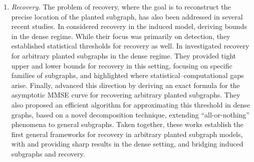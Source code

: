 \documentclass[12pt]{article}
\begin{document}
\begin{enumerate}[leftmargin=*]
    \item \emph{Recovery.} The problem of recovery, where the goal is to reconstruct the precise location of the planted subgraph, has also been addressed in several recent studies. In \cite{Huleihel2022} considered recovery in the induced model, deriving bounds in the dense regime. While their focus was primarily on detection, they established statistical thresholds for recovery as well. In \cite{pmlr-v195-mossel23a} investigated recovery for arbitrary planted subgraphs in the dense regime. They provided tight upper and lower bounds for recovery in this setting, focusing on specific families of subgraphs, and highlighted where statistical–computational gaps arise. Finally, \cite{LeePerniceRajaramanZadik2025} advanced this direction by deriving an exact formula for the asymptotic MMSE curve for recovering arbitrary planted subgraphs. They also proposed an efficient algorithm for approximating this threshold in dense graphs, based on a novel decomposition technique, extending “all-or-nothing” phenomena to general subgraphs. Taken together, these works establish the first general frameworks for recovery in arbitrary planted subgraph models, with \cite{pmlr-v195-mossel23a} and \cite{LeePerniceRajaramanZadik2025} providing sharp results in the dense setting, and \cite{Huleihel2022} bridging induced subgraphs and recovery.
\end{enumerate}
\end{document}
